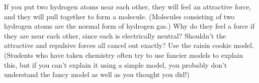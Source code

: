 If you put two hydrogen atoms near each other, they will
feel an attractive force, and they will pull together to
form a molecule. (Molecules consisting of two hydrogen
atoms are the normal form of hydrogen gas.) Why do they
feel a force if they are near each other, since each is
electrically neutral? Shouldn't the attractive and
repulsive forces all cancel out exactly? Use the raisin
cookie model. (Students who have taken chemistry often try
to use fancier models to explain this, but if you can't
explain it using a simple model, you probably don't
understand the fancy model as well as you thought you did!)
